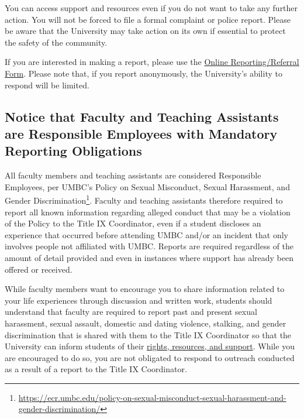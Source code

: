 \documentclass[letter,10pt]{article}
\begin{document}
You can access support and resources even if you do not want to take any further action. You will not be forced to file a formal complaint or police report. Please be aware that the University may take action on its own if essential to protect the safety of the community.

If you are interested in making a report, please use the \href{https://umbc-advocate.symplicity.com/titleix_report/index.php/pid364290?}{Online Reporting/Referral Form}.  Please note that, if you report anonymously, the University’s ability to respond will be limited.

\subsection*{Notice that Faculty and Teaching Assistants are Responsible Employees with Mandatory Reporting Obligations}

All faculty members and teaching assistants are considered Responsible Employees, per UMBC’s Policy on Sexual Misconduct, Sexual Harassment, and Gender Discrimination\footnote{\url{https://ecr.umbc.edu/policy-on-sexual-misconduct-sexual-harassment-and-gender-discrimination/}}. Faculty and teaching assistants therefore required to report all known information regarding alleged conduct that may be a violation of the Policy to the Title IX Coordinator, even if a student discloses an experience that occurred before attending UMBC and/or an incident that only involves people not affiliated with UMBC.  Reports are required regardless of the amount of detail provided and even in instances where support has already been offered or received.

While faculty members want to encourage you to share information related to your life experiences through discussion and written work, students should understand that faculty are required to report past and present sexual harassment, sexual assault, domestic and dating violence, stalking, and gender discrimination that is shared with them to the Title IX Coordinator so that the University can inform students of their \href{https://ecr.umbc.edu/rights-and-resources/}{rights, resources, and support}.  While you are encouraged to do so, you are not obligated to respond to outreach conducted as a result of a report to the Title IX Coordinator.
\end{document}
